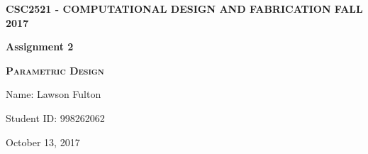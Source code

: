\documentclass {article}
\begin{document}
	
	
	
	
	
	
	
	
	
	
	
	
	\begin{center}
		\Large
		
		\textbf{\MakeUppercase{CSC2521 - Computational Design and Fabrication Fall 2017}}
		\vfill  
		
		{
			\Huge
			\textbf{Assignment 2}
		}
		
		{
			\Large
			\textsc{\textbf{Parametric Design}}
		}
		
		\vfill
		Name: Lawson Fulton
		
		Student ID: 998262062
		
		October 13, 2017
	\end{center}
	
\end{document}
